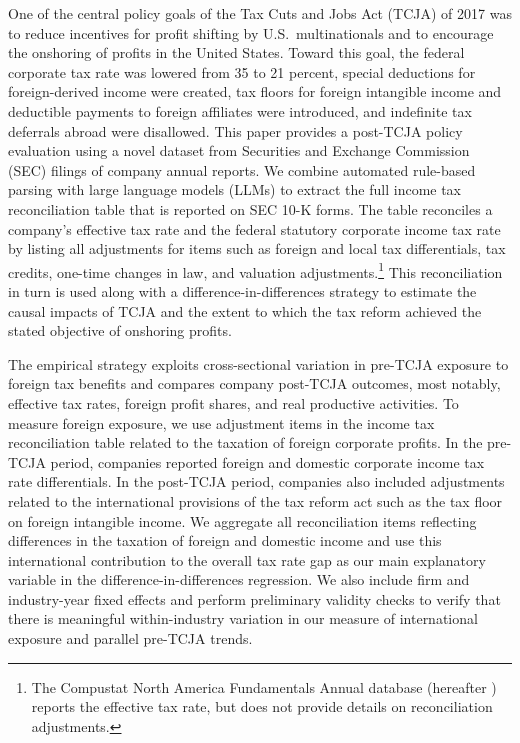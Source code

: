 \documentclass[11pt,letterpaper]{article}
\begin{document}
One of the central policy goals of the Tax Cuts and Jobs Act (TCJA) of 2017 was to
reduce incentives for profit shifting by U.S.~multinationals and to 
encourage the onshoring of profits in the United States. Toward this goal, 
the federal corporate tax rate was lowered from 35
to 21 percent, special deductions for foreign-derived income were created,
tax floors for foreign intangible income and deductible payments to foreign
affiliates were introduced,
and
indefinite tax deferrals abroad were disallowed.
This paper provides a post-TCJA policy evaluation using a novel dataset
from Securities and Exchange Commission (SEC) filings of company annual reports.
We combine automated rule-based parsing with large language models (LLMs)
to extract the full income tax
reconciliation table that is reported on SEC 10-K forms. The table reconciles
a company's effective tax rate and the federal statutory corporate income tax rate by listing
all adjustments for items such as foreign and local tax differentials, tax credits,
one-time changes in law, and valuation adjustments.\footnote{%
The Compustat North America Fundamentals Annual database (hereafter \citet{CompustatAnnual})
reports the effective tax rate,
but does not provide details on reconciliation adjustments.}
This reconciliation in turn is used along with a difference-in-differences 
strategy to estimate the causal impacts of TCJA and the
extent to which the tax reform achieved the stated objective of onshoring
profits. 

The empirical strategy exploits cross-sectional variation in pre-TCJA exposure to foreign 
tax benefits and compares company post-TCJA outcomes, most notably, effective tax rates, 
foreign profit shares, and real productive activities.
To measure foreign exposure, we use adjustment items in the income tax reconciliation
table related to the taxation of foreign corporate profits. In the pre-TCJA period,
companies reported foreign and domestic corporate income tax rate differentials.
In the post-TCJA period, companies also included adjustments related to the international 
provisions of the tax reform act such as the tax floor on foreign intangible income.
We aggregate all reconciliation items reflecting differences in the
taxation of foreign and domestic income
and use this international contribution to the overall tax rate
gap as our main explanatory variable in the difference-in-differences regression.
We also include firm and industry-year fixed effects and perform preliminary 
validity checks to verify that there is meaningful within-industry variation
in our measure of international exposure and parallel pre-TCJA trends.  
\end{document}
